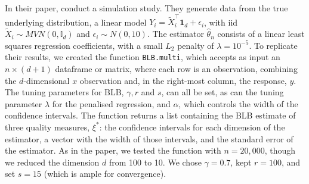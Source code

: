 \documentclass{article}\usepackage[]{graphicx}\usepackage[]{color}
\begin{document}
In their paper, \textcite{Kleiner2014} conduct a simulation study. They generate data from the true underlying distribution, a linear model $Y_i = \tilde X_i^{\top}\textbf{1}_d + \epsilon_i$, with iid $\tilde X_i \sim MVN(0,\mathbb{I}_d)$ and $\epsilon_i \sim N(0,10)$. The estimator $\hat\theta_n$ consists of a linear least squares regression coefficients, with a small $L_2$ penalty of $\lambda=10^{-5}$. To replicate their results, we created the function \texttt{BLB.multi}, which accepts as input an $n \times (d+1)$ dataframe or matrix, where each row is an observation, combining the $d$-dimensional $x$ observation and, in the right-most column, the response, $y$. The tuning parameters for BLB, $\gamma, r$ and $s$, can all be set, as can the tuning parameter $\lambda$ for the penalised regression, and $\alpha$, which controls the width of the confidence intervals. The function returns a list containing the BLB estimate of three quality measures, $\xi^*$: the confidence intervals for each dimension of the estimator, a vector with the width of those intervals, and the standard error of the estimator. As in the paper, we tested the function with $n=20,000$, though we reduced the dimension $d$ from 100 to 10. We chose $\gamma=0.7$, kept $r=100$, and set $s=15$ (which is ample for convergence).
\end{document}
